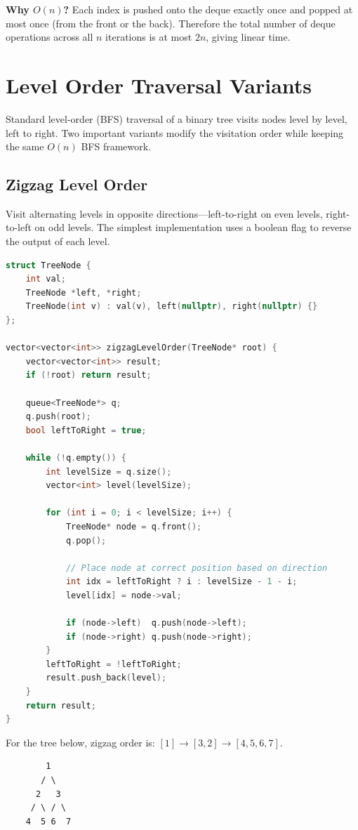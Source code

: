 \textbf{Why $O(n)$?} Each index is pushed onto the deque exactly once and popped at most once (from the front or the back). Therefore the total number of deque operations across all $n$ iterations is at most $2n$, giving linear time.

\section{Level Order Traversal Variants}

Standard level-order (BFS) traversal of a binary tree visits nodes level by level, left to right. Two important variants modify the visitation order while keeping the same $O(n)$ BFS framework.

\subsection{Zigzag Level Order}

Visit alternating levels in opposite directions---left-to-right on even levels, right-to-left on odd levels. The simplest implementation uses a boolean flag to reverse the output of each level.

\begin{lstlisting}[language=C++]
struct TreeNode {
    int val;
    TreeNode *left, *right;
    TreeNode(int v) : val(v), left(nullptr), right(nullptr) {}
};

vector<vector<int>> zigzagLevelOrder(TreeNode* root) {
    vector<vector<int>> result;
    if (!root) return result;

    queue<TreeNode*> q;
    q.push(root);
    bool leftToRight = true;

    while (!q.empty()) {
        int levelSize = q.size();
        vector<int> level(levelSize);

        for (int i = 0; i < levelSize; i++) {
            TreeNode* node = q.front();
            q.pop();

            // Place node at correct position based on direction
            int idx = leftToRight ? i : levelSize - 1 - i;
            level[idx] = node->val;

            if (node->left)  q.push(node->left);
            if (node->right) q.push(node->right);
        }
        leftToRight = !leftToRight;
        result.push_back(level);
    }
    return result;
}
\end{lstlisting}

For the tree below, zigzag order is: $[1] \to [3, 2] \to [4, 5, 6, 7]$.
\begin{verbatim}
        1
       / \
      2   3
     / \ / \
    4  5 6  7
\end{verbatim}

